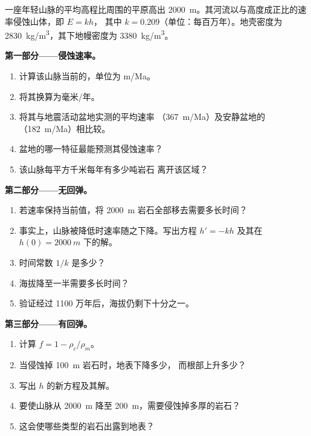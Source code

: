 \begin{problem}
\label{pb:g12:destruction-of-mountains:1}
一座年轻山脉的平均高程比周围的平原高出
\qty{2000}{m}。其河流以与高度成正比的速率侵蚀山体，即 $E = kh$，
其中 $k = 0.209$（单位：每百万年）。地壳密度为
\qty{2830}{kg/m^3}，其下地幔密度为 \qty{3380}{kg/m^3}。

\medskip
\noindent\textbf{第一部分——侵蚀速率。}
\begin{enumerate}
  \item 计算该山脉当前的，单位为 \unit{m/Ma}。
  \item 将其换算为毫米/年。
  \item 将其与地震活动盆地实测的平均速率
        （\qty{367}{m/Ma}）及安静盆地的（\qty{182}{m/Ma}）相比较。
  \item 盆地的哪一特征最能预测其侵蚀速率？
  \item 该山脉每平方千米每年有多少吨岩石
        离开该区域？
\end{enumerate}

\medskip
\noindent\textbf{第二部分——无回弹。}
\begin{enumerate}[resume]
  \item 若速率保持当前值，将
        \qty{2000}{m} 岩石全部移去需要多长时间？
  \item 事实上，山脉被降低时速率随之下降。写出方程
        $h' = -kh$ 及其在 $h(0) = \qty{2000}{m}$ 下的解。
  \item 时间常数 $1/k$ 是多少？
  \item 海拔降至一半需要多长时间？
  \item 验证经过 1100 万年后，海拔仍剩下十分之一。
\end{enumerate}

\medskip
\noindent\textbf{第三部分——有回弹。}
\begin{enumerate}[resume]
  \item 计算 $f = 1 - \rho_c/\rho_m$。
  \item 当侵蚀掉 \qty{100}{m} 岩石时，地表下降多少，
        而根部上升多少？
  \item 写出 $h$ 的新方程及其解。
  \item 要使山脉从
        \qty{2000}{m} 降至 \qty{200}{m}，需要侵蚀掉多厚的岩石？
  \item 这会使哪些类型的岩石出露到地表？
\end{enumerate}


\end{problem}

